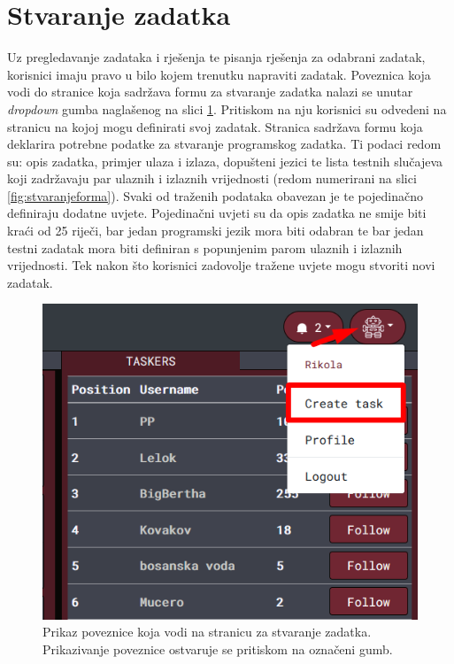\documentclass[times, utf8, zavrsni, numeric]{fer}
\begin{document}
		\section{Stvaranje zadatka}
		Uz pregledavanje zadataka i rješenja te pisanja rješenja za odabrani zadatak, korisnici imaju pravo u bilo kojem trenutku napraviti zadatak. Poveznica koja vodi do stranice koja sadržava formu za stvaranje zadatka nalazi se unutar \textit{dropdown} gumba naglašenog na slici \ref{fig:dropdowntask}. Pritiskom na nju korisnici su odvedeni na stranicu na kojoj mogu definirati svoj zadatak. Stranica sadržava formu koja deklarira potrebne podatke za stvaranje programskog zadatka. Ti podaci redom su: opis zadatka, primjer ulaza i izlaza, dopušteni jezici te lista testnih slučajeva koji zadržavaju par ulaznih i izlaznih vrijednosti (redom numerirani na slici \ref{fig:stvaranjeforma}). Svaki od traženih podataka obavezan je te pojedinačno definiraju dodatne uvjete. Pojedinačni uvjeti su da opis zadatka ne smije biti kraći od 25 riječi, bar jedan programski jezik mora biti odabran te bar jedan testni zadatak mora biti definiran s popunjenim parom ulaznih i izlaznih vrijednosti. Tek nakon što korisnici zadovolje tražene uvjete mogu stvoriti novi zadatak.
		\begin{figure}[H]
			\centering
			\includegraphics[scale=0.65]{pictures/koristenje/StvoriDropdown.png}
			\caption{Prikaz poveznice koja vodi na stranicu za stvaranje zadatka. Prikazivanje poveznice ostvaruje se pritiskom na označeni gumb.}
			\label{fig:dropdowntask}
		\end{figure}
\end{document}
